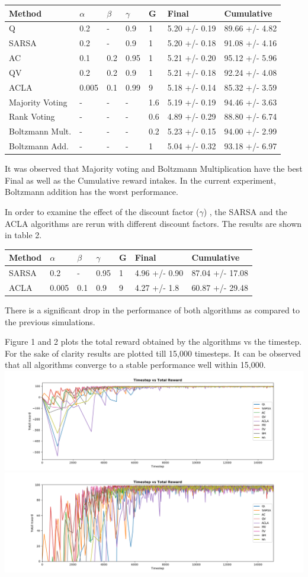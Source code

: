 \begin{longtable}[]{@{}lllllll@{}}
\toprule
Method & \(\alpha\) & \(\beta\) & \(\gamma\) & G & Final &
Cumulative\tabularnewline
\midrule
\endhead
Q & 0.2 & - & 0.9 & 1 & 5.20 +/- 0.19 & 89.66 +/- 4.82\tabularnewline
SARSA & 0.2 & - & 0.9 & 1 & 5.20 +/- 0.18 & 91.08 +/-
4.16\tabularnewline
AC & 0.1 & 0.2 & 0.95 & 1 & 5.21 +/- 0.20 & 95.12 +/-
5.96\tabularnewline
QV & 0.2 & 0.2 & 0.9 & 1 & 5.21 +/- 0.18 & 92.24 +/- 4.08\tabularnewline
ACLA & 0.005 & 0.1 & 0.99 & 9 & 5.18 +/- 0.14 & 85.32 +/-
3.59\tabularnewline
Majority Voting & - & - & - & 1.6 & 5.19 +/- 0.19 & 94.46 +/-
3.63\tabularnewline
Rank Voting & - & - & - & 0.6 & 4.89 +/- 0.29 & 88.80 +/-
6.74\tabularnewline
Boltzmann Mult. & - & - & - & 0.2 & 5.23 +/- 0.15 & 94.00 +/-
2.99\tabularnewline
Boltzmann Add. & - & - & - & 1 & 5.04 +/- 0.32 & 93.18 +/-
6.97\tabularnewline
\bottomrule
\end{longtable}


 It was observed that Majority voting and Boltzmann Multiplication have
the best Final as well as the Cumulative reward intakes. In the current
experiment, Boltzmann addition has the worst performance.

In order to examine the effect of the discount factor (\(\gamma\)) , the
SARSA and the ACLA algorithms are rerun with different discount factors.
The results are shown in table 2.

\begin{longtable}[]{@{}lllllll@{}}
\toprule
Method & \(\alpha\) & \(\beta\) & \(\gamma\) & G & Final &
Cumulative\tabularnewline
\midrule
\endhead
SARSA & 0.2 & - & 0.95 & 1 & 4.96 +/- 0.90 & 87.04 +/-
17.08\tabularnewline
ACLA & 0.005 & 0.1 & 0.9 & 9 & 4.27 +/- 1.8 & 60.87 +/-
29.48\tabularnewline
\bottomrule
\end{longtable}


 There is a significant drop in the performance of both algorithms as
compared to the previous simulations.

Figure 1 and 2 plots the total reward obtained by the algorithms vs the
timestep. For the sake of clarity results are plotted till 15,000
timesteps. It can be observed that all algorithms converge to a stable
performance well within 15,000.
\includegraphics{img/Timestep_vs_Total_reward_simple.png}
\includegraphics{img/Timestep_vs_Total_reward_zoomed_simple.png}

